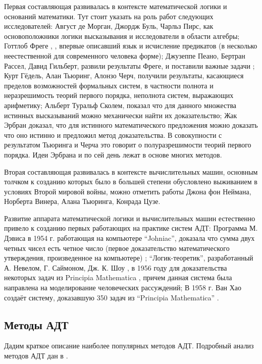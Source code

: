 Первая составляющая развивалась в контексте математической логики и оснований математики. Тут стоит указать на роль работ следующих исследователей: Август де Морган, Джордж Буль, Чарльз Пирс, как основоположники логики высказывания и исследователи в области алгебры; Готтлоб Фреге \cite{Frege}, \cite{Sourcebook}, впервые описавший язык и исчисление предикатов (в несколько неестественной для современного человека форме); Джузеппе Пеано, Бертран Рассел, Давид Гильберт, развили результаты Фреге, и поставили важные задачи \cite{GilbertAkkerman}; Курт Гёдель, Алан Тьюринг, Алонзо Черч, получили результаты, касающиеся пределов возможностей формальных систем, в частности полнота \cite{Godel1} и неразрешимость теорий первого порядка, неполнота систем, выражающих арифметику; Альберт Туральф Сколем, показал что для данного множества истинных высказываний можно механически найти их доказательство; Жак Эрбран доказал, что для истинного математического предложения можно доказать что оно истинно и предложил метод доказательства. В совокупности с результатом Тьюринга и Черча это говорит о полуразрешимости теорий первого порядка. Идеи Эрбрана и по сей день лежат в основе многих методов.

Вторая составляющая развивалась в контексте вычислительных машин, основным толчком к созданию которых было в большей степени обусловлено выживанием в условиях Второй мировой войны, можно отметить работы Джона фон Неймана, Норберта Винера, Алана Тьюринга, Конрада Цузе.

Развитие аппарата математической логики и вычислительных машин естественно привело к созданию первых работающих на практике систем АДТ: Программа М. Дэвиса в 1954 г. работающая на компьютере ``Johniac'', доказала что сумма двух четных чисел есть четное число (первое доказательство математического утверждения, произведенное на компьютере) \cite{LogicComp}; ``Логик-теоретик'', разработанный А. Невелом, Г. Саймоном, Дж. К. Шоу \cite{Newell1}, \cite{Newell2} в 1956 году для доказательства некоторых задач из Principia Mathematica \cite{PrinMat}, причем данная система была направлена на моделирование человеческих рассуждений; В 1958 г. Ван Хао создаёт систему, доказавшую 350 задач из ``Principia Mathematica'' \cite{WangHao}.


\subsection{Методы АДТ}
Дадим краткое описание наиболее популярных методов АДТ. Подробный анализ методов АДТ дан в \cite{HAR}.

